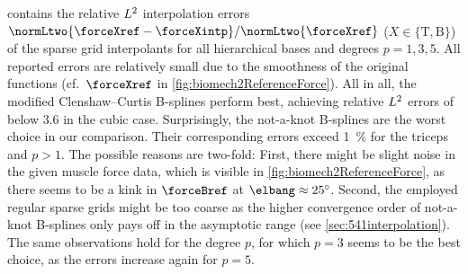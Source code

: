  contains the relative $L^2$
interpolation errors
$\normLtwo{\forceXref - \forceXintp}/\normLtwo{\forceXref}$
($X \in \{\mathrm{T}, \mathrm{B}\}$) of the sparse grid interpolants
for all hierarchical bases and degrees $p = 1, 3, 5$.
All reported errors are relatively small
due to the smoothness of the original functions
(cf.\ $\forceXref$ in \cref{fig:biomech2ReferenceForce}).
All in all, the modified Clenshaw--Curtis B-splines perform best,
achieving relative $L^2$ errors of below \SI{3.6}{\permille}
in the cubic case.
Surprisingly, the not-a-knot B-splines are the worst choice in our
comparison.
Their corresponding errors exceed \SI{1}{\percent} for the triceps
and $p > 1$.
The possible reasons are two-fold:
First, there might be slight noise in the given muscle force data,
which is visible in \cref{fig:biomech2ReferenceForce},
as there seems to be a kink in $\forceBref$ at $\elbang \approx \ang{25}$.
Second, the employed regular sparse grids might be too coarse
as the higher convergence order of not-a-knot B-splines
only pays off in the asymptotic range (see \cref{sec:541interpolation}).
The same observations hold for the degree $p$,
for which $p = 3$ seems to be the best choice,
as the errors increase again for $p = 5$.

